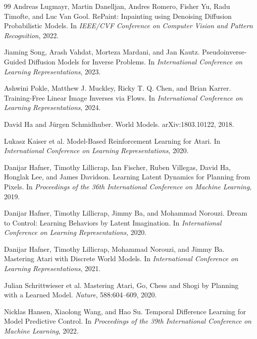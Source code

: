 \documentclass[10pt,twocolumn,letterpaper]{article}
\begin{document}
\begin{thebibliography}{99}
Andreas Lugmayr, Martin Danelljan, Andres Romero, Fisher Yu, Radu Timofte, and
Luc Van Gool.
\newblock RePaint: Inpainting using Denoising Diffusion Probabilistic Models.
\newblock In \emph{IEEE/CVF Conference on Computer Vision and Pattern
Recognition}, 2022.

Jiaming Song, Arash Vahdat, Morteza Mardani, and Jan Kautz.
\newblock Pseudoinverse-Guided Diffusion Models for Inverse Problems.
\newblock In \emph{International Conference on Learning Representations}, 2023.

Ashwini Pokle, Matthew J. Muckley, Ricky T. Q. Chen, and Brian Karrer.
\newblock Training-Free Linear Image Inverses via Flows.
\newblock In \emph{International Conference on Learning Representations}, 2024.

David Ha and J{\"u}rgen Schmidhuber.
\newblock World Models.
\newblock arXiv:1803.10122, 2018.

Lukasz Kaiser et al.
\newblock Model-Based Reinforcement Learning for Atari.
\newblock In \emph{International Conference on Learning Representations}, 2020.

Danijar Hafner, Timothy Lillicrap, Ian Fischer, Ruben Villegas, David Ha,
Honglak Lee, and James Davidson.
\newblock Learning Latent Dynamics for Planning from Pixels.
\newblock In \emph{Proceedings of the 36th International Conference on Machine
Learning}, 2019.

Danijar Hafner, Timothy Lillicrap, Jimmy Ba, and Mohammad Norouzi.
\newblock Dream to Control: Learning Behaviors by Latent Imagination.
\newblock In \emph{International Conference on Learning Representations}, 2020.

Danijar Hafner, Timothy Lillicrap, Mohammad Norouzi, and Jimmy Ba.
\newblock Mastering Atari with Discrete World Models.
\newblock In \emph{International Conference on Learning Representations}, 2021.

Julian Schrittwieser et al.
\newblock Mastering Atari, Go, Chess and Shogi by Planning with a Learned Model.
\newblock \emph{Nature}, 588:604--609, 2020.

Nicklas Hansen, Xiaolong Wang, and Hao Su.
\newblock Temporal Difference Learning for Model Predictive Control.
\newblock In \emph{Proceedings of the 39th International Conference on Machine
Learning}, 2022.


\end{thebibliography}
\end{document}
